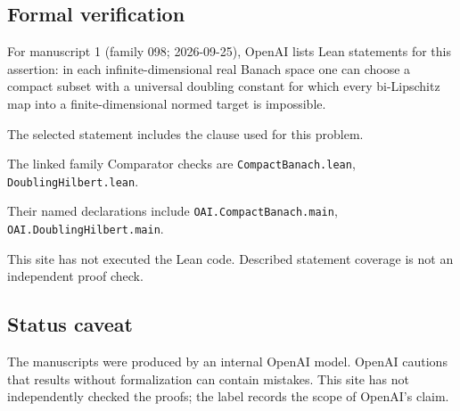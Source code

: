 \documentclass[11pt]{article}
\begin{document}
\subsection{Formal verification}
For manuscript 1 (family 098; 2026-09-25), OpenAI lists Lean statements for this assertion: in each infinite-dimensional real Banach space one can choose a compact subset with a universal doubling constant for which every bi-Lipschitz map into a finite-dimensional normed target is impossible.

The selected statement includes the clause used for this problem.

The linked family Comparator checks are \texttt{CompactBanach.lean}, \texttt{DoublingHilbert.lean}.

Their named declarations include \texttt{OAI.CompactBanach.main}, \texttt{OAI.DoublingHilbert.main}.

This site has not executed the Lean code. Described statement coverage is not an independent proof check.

\subsection{Status caveat}
The manuscripts were produced by an internal OpenAI model. OpenAI cautions that results without formalization can contain mistakes. This site has not independently checked the proofs; the label records the scope of OpenAI's claim.
\end{document}
